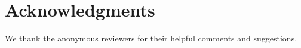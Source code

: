 \section*{Acknowledgments}
We thank the anonymous reviewers for their helpful comments and suggestions. 